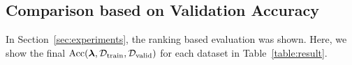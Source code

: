 

\subsection{Comparison based on Validation Accuracy}
\label{app:result_details}


In Section~\ref{sec:experiments}, the ranking based evaluation was shown.
%
Here, we show the final
$\mathrm{Acc}(\boldsymbol{\lambda}, {\mathcal D}_{\mathrm{train}}, {\mathcal D}_{\mathrm{valid}})$
for each dataset in Table~\ref{table:result}.


